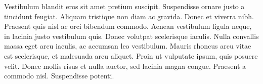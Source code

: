 Vestibulum blandit eros sit amet pretium suscipit. Suspendisse ornare justo a tincidunt feugiat. Aliquam tristique non diam ac gravida. Donec et viverra nibh. Praesent quis nisl ac orci bibendum commodo. Aenean vestibulum ligula neque, in lacinia justo vestibulum quis. Donec volutpat scelerisque iaculis. Nulla convallis massa eget arcu iaculis, ac accumsan leo vestibulum. Mauris rhoncus arcu vitae est scelerisque, et malesuada arcu aliquet. Proin ut vulputate ipsum, quis posuere velit. Donec mollis risus et nulla auctor, sed lacinia magna congue. Praesent a commodo nisl. Suspendisse potenti.
